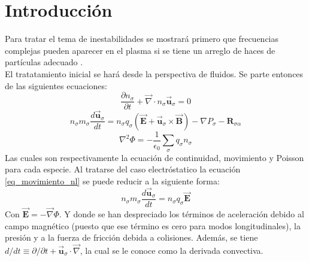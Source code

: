 \documentclass[../tesis_main_file.tex]{subfiles}
\begin{document}
\onlyinsubfile{\setcounter{chapter}{1}}
\section{Introducción}
Para tratar el tema de inestabilidades se mostrará primero que frecuencias complejas pueden aparecer en el plasma si se tiene un arreglo de haces de partículas adecuado \cite{bellan2008fundamentals}.\\
El tratatamiento inicial se hará desde la perspectiva de fluidos. Se parte entonces de las siguientes ecuaciones:
\begin{equation}
\label{cont_nl}
\frac{\partial n_{\sigma}}{\partial t} + \overrightarrow{\nabla} \cdot n_{\sigma}\overrightarrow{\textbf{u}}_{\sigma}=0
\end{equation}
\begin{equation}
\label{eq_movimiento_nl}
n_{\sigma}m_{\sigma}\frac{d\overrightarrow{\textbf{u}}_{\sigma}}{dt}= n_{\sigma}q_{\sigma}(\overrightarrow{\textbf{E}} + \overrightarrow{\textbf{u}}_{\sigma} \times \overrightarrow{\textbf{B}}) - \nabla P_{\sigma} - \textbf{R}_{\sigma \alpha}
\end{equation}
\begin{equation}
\label{poisson_nl}
\nabla ^2 \Phi = -\frac{1}{\epsilon_0}\sum _{\sigma}q_{\sigma} n_{\sigma}
\end{equation}
Las cuales son respectivamente la ecuación de continuidad, movimiento y Poisson para cada especie. Al tratarse del caso electróstatico la ecuación \ref{eq_movimiento_nl} se puede reducir a la siguiente forma:
\begin{equation}
\label{eq_mov_simpl_nl}
n_{\sigma}m_{\sigma}\frac{d\overrightarrow{\textbf{u}}_{\sigma}}{dt}= n_{\sigma}q_{\sigma} \overrightarrow{\textbf{E}}
\end{equation}
Con $\overrightarrow{\textbf{E}} = - {\overrightarrow\nabla} \Phi$. Y donde se han despreciado los términos de aceleración debido al campo magnético (puesto que ese término es cero para modos longitudinales), la presión y a la fuerza de fricción debida a colisiones. Además, se tiene $d/dt \equiv \partial / \partial t + \overrightarrow{\textbf{u}}_{\sigma} \cdot \overrightarrow{\nabla}$, la cual se le conoce como la derivada convectiva.\\
\end{document}
